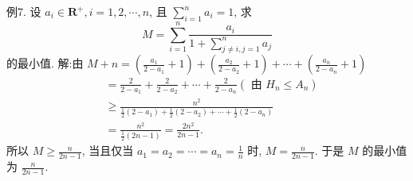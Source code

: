 例7. 设 $a_i \in \mathbf{R}^{+}, i=1,2, \cdots, n$, 且 $\sum_{i=1}^n a_i=1$, 求
$$
M=\sum_{i=1}^n \frac{a_i}{1+\sum_{j \neq i, j=1}^n a_j}
$$
的最小值.
解:由 $M+n=\left(\frac{a_1}{2-a_1}+1\right)+\left(\frac{a_2}{2-a_2}+1\right)+\cdots+\left(\frac{a_n}{2-a_n}+1\right)$
$$
\begin{aligned}
& =\frac{2}{2-a_1}+\frac{2}{2-a_2}+\cdots+\frac{2}{2-a_n}\left(\text { 由 } H_n \leqslant A_n\right) \\
& \geqslant \frac{n^2}{\frac{1}{2}\left(2-a_1\right)+\frac{1}{2}\left(2-a_2\right)+\cdots+\frac{1}{2}\left(2-a_n\right)} \\
& =\frac{n^2}{\frac{1}{2}(2 n-1)}=\frac{2 n^2}{2 n-1} .
\end{aligned}
$$
所以 $M \geqslant \frac{n}{2 n-1}$, 当且仅当 $a_1=a_2=\cdots=a_n=\frac{1}{n}$ 时, $M=\frac{n}{2 n-1}$.
于是 $M$ 的最小值为 $\frac{n}{2 n-1}$.



